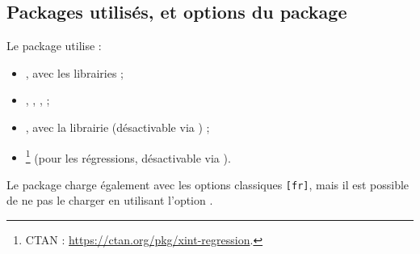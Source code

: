 \documentclass[11pt,a4paper]{ltxdoc}
\begin{document}
%
%
%
%
%

\subsection{Packages utilisés, et options du package}

Le package utilise :

\smallskip

\begin{itemize}
  \item {}, avec les librairies  ;
  \item {}, , ,  ;
  \item {}, avec la librairie  (désactivable via \MontreCode{[nonpgfplots]}) ;
  \item {}\footnote{CTAN : \url{https://ctan.org/pkg/xint-regression}.} (pour les régressions, désactivable via \MontreCode{[nonxintreg]}).
\end{itemize}

\smallskip

Le package charge également  avec les options classiques \texttt{[fr]}, mais il est possible de ne pas le charger en utilisant l'option \MontreCode{[nonsiunitx]}.
\end{document}
